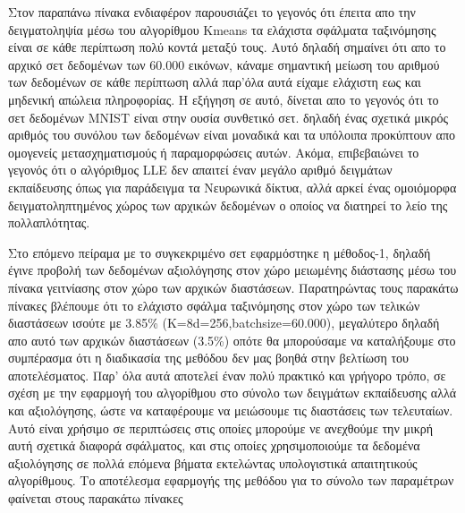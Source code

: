 \par
Στον παραπάνω πίνακα ενδιαφέρον παρουσιάζει το γεγονός ότι έπειτα απο την δειγματοληψία μέσω του αλγορίθμου \textlatin{Kmeans} τα ελάχιστα σφάλματα ταξινόμησης είναι σε κάθε περίπτωση πολύ κοντά μεταξύ τους. Αυτό δηλαδή σημαίνει ότι απο το αρχικό σετ δεδομένων των 60.000 εικόνων, κάναμε σημαντική μείωση του αριθμού των δεδομένων σε κάθε περίπτωση αλλά παρ'όλα αυτά είχαμε ελάχιστη εως και μηδενική απώλεια πληροφορίας. Η εξήγηση σε αυτό, δίνεται απο το γεγονός ότι το σετ δεδομένων \textlatin{MNIST} είναι στην ουσία συνθετικό σετ. δηλαδή ένας σχετικά μικρός αριθμός του συνόλου των δεδομένων είναι μοναδικά και τα υπόλοιπα προκύπτουν απο ομογενείς μετασχηματισμούς ή παραμορφώσεις αυτών. Ακόμα, επιβεβαιώνει το γεγονός ότι ο αλγόριθμος \textlatin{LLE} δεν απαιτεί έναν μεγάλο αριθμό δειγμάτων εκπαίδευσης όπως για παράδειγμα τα Νευρωνικά δίκτυα, αλλά αρκεί ένας ομοιόμορφα δειγματοληπτημένος χώρος των αρχικών δεδομένων ο οποίος να διατηρεί το λείο της πολλαπλότητας.
\par
Στο επόμενο πείραμα με το συγκεκριμένο σετ εφαρμόστηκε η μέθοδος-1, δηλαδή έγινε προβολή των δεδομένων αξιολόγησης στον χώρο μειωμένης διάστασης μέσω του πίνακα γειτνίασης στον χώρο των αρχικών διαστάσεων. Παρατηρώντας τους παρακάτω πίνακες βλέπουμε ότι το ελάχιστο σφάλμα ταξινόμησης στον χώρο των τελικών διαστάσεων ισούτε με 3.85\% (Κ=8\textlatin{d}=256,\textlatin{batch\textunderscore size=60.000}), μεγαλύτερο δηλαδή απο αυτό των αρχικών διαστάσεων (3.5\%) οπότε θα μπορούσαμε να καταλήξουμε στο συμπέρασμα ότι η διαδικασία της μεθόδου δεν μας βοηθά στην βελτίωση του αποτελέσματος. Παρ' όλα αυτά αποτελεί έναν πολύ πρακτικό και γρήγορο τρόπο, σε σχέση με την εφαρμογή του αλγορίθμου στο σύνολο των δειγμάτων εκπαίδευσης αλλά και αξιολόγησης, ώστε να καταφέρουμε να μειώσουμε τις διαστάσεις των τελευταίων. Αυτό είναι χρήσιμο σε περιπτώσεις στις οποίες μπορούμε νε ανεχθούμε την μικρή αυτή σχετικά διαφορά σφάλματος, και στις οποίες χρησιμοποιούμε τα δεδομένα αξιολόγησης σε πολλά επόμενα βήματα εκτελώντας υπολογιστικά απαιτητικούς αλγορίθμους. Το αποτέλεσμα εφαρμογής της μεθόδου για το σύνολο των παραμέτρων φαίνεται στους παρακάτω πίνακες
